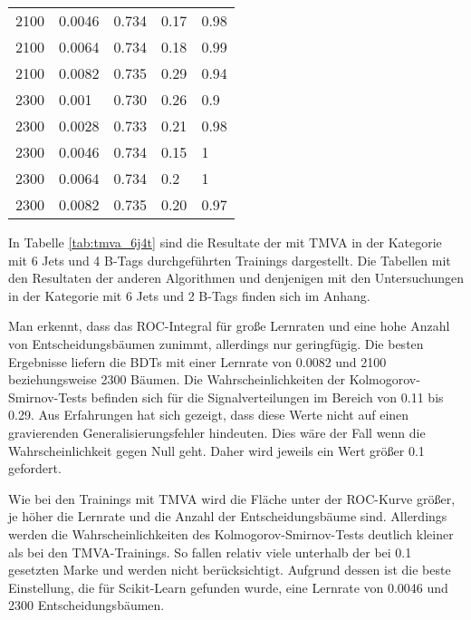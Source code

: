 \begin{table}[tbp]
\begin{center}
\begin{tabular}{lllll}
 \num{2100}  & \num{0,0046}  & \num{0,734} & \num{0,17} & \num{0,98}\\
 \num{2100}  & \num{0,0064}  & \num{0,734} & \num{0,18} & \num{0,99}\\
 \num{2100}  & \num{0,0082}  & \num{0,735} & \num{0,29} & \num{0,94}\\
 \num{2300}  & \num{0,001}   & \num{0,730} & \num{0,26} & \num{0,9}\\
 \num{2300}  & \num{0,0028}  & \num{0,733} & \num{0,21} & \num{0,98}\\
 \num{2300}  & \num{0,0046}  & \num{0,734} & \num{0,15} & \num{1}\\
 \num{2300}  & \num{0,0064}  & \num{0,734} & \num{0,2}  & \num{1}\\
 \num{2300}  & \num{0,0082}  & \num{0,735} & \num{0,20} & \num{0,97}\\
  \hline
  \end{tabular}
  \end{center}
\end{table}

In Tabelle \ref{tab:tmva_6j4t} sind die Resultate der mit TMVA in der Kategorie mit 6 Jets und 4 B-Tags durchgef\"uhrten Trainings dargestellt. Die Tabellen mit den Resultaten der anderen Algorithmen und denjenigen mit den Untersuchungen in der Kategorie mit 6 Jets und 2 B-Tags finden sich im Anhang.

Man erkennt, dass das ROC-Integral f\"ur gro\ss e Lernraten und eine hohe Anzahl von Entscheidungsb\"aumen zunimmt, allerdings nur geringf\"ugig. Die besten Ergebnisse liefern die BDTs mit einer Lernrate von \num{0,0082} und 2100 beziehungsweise 2300 B\"aumen. Die Wahrscheinlichkeiten der Kolmogorov-Smirnov-Tests befinden sich f\"ur die Signalverteilungen im Bereich von \num{0,11} bis \num{0,29}. Aus Erfahrungen hat sich gezeigt, dass diese Werte nicht auf einen gravierenden Generalisierungsfehler hindeuten. Dies w\"are der Fall wenn die Wahrscheinlichkeit gegen Null geht. Daher wird jeweils ein Wert gr\"o\ss er \num{0,1} gefordert.

Wie bei den Trainings mit TMVA wird die Fl\"ache unter der ROC-Kurve gr\"o\ss er, je h\"oher die Lernrate und die Anzahl der Entscheidungsb\"aume sind. Allerdings werden die Wahrscheinlichkeiten des Kolmogorov-Smirnov-Tests deutlich kleiner als bei den TMVA-Trainings. So fallen relativ viele unterhalb der bei \num{0,1} gesetzten Marke und werden nicht ber\"ucksichtigt. Aufgrund dessen ist die beste Einstellung, die f\"ur Scikit-Learn gefunden wurde, eine Lernrate von \num{0,0046} und \num{2300} Entscheidungsb\"aumen.

